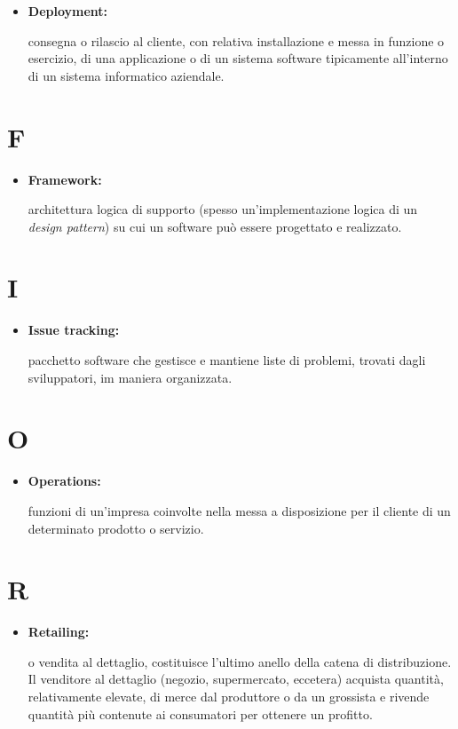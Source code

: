 \begin{itemize}
	\item \hypertarget{dep}{\textbf{Deployment:}} consegna o rilascio al cliente, con relativa installazione e messa in funzione o esercizio, di una applicazione o di un sistema software tipicamente all'interno di un sistema informatico aziendale.
\end{itemize}

\section*{F}

\begin{itemize}
	\item \hypertarget{fw}{\textbf{Framework:}} architettura logica di supporto (spesso un'implementazione logica di un \textit{design pattern}) su cui un software può essere progettato e realizzato.
\end{itemize}

\section*{I}

\begin{itemize}
	\item \hypertarget{it}{\textbf{Issue tracking:}} pacchetto software che gestisce e mantiene liste di problemi, trovati dagli sviluppatori, im maniera organizzata.
\end{itemize}

\section*{O}

\begin{itemize}
	\item \hypertarget{ops}{\textbf{Operations:}} funzioni di un'impresa coinvolte nella messa a disposizione per il cliente di un determinato prodotto o servizio.  
\end{itemize}

\section*{R}

\begin{itemize}
	\item \hypertarget{ret}{\textbf{Retailing:}} o vendita al dettaglio, costituisce l'ultimo anello della catena di distribuzione. Il venditore al dettaglio (negozio, supermercato, eccetera) acquista quantità, relativamente elevate, di merce dal produttore o da un grossista e rivende quantità più contenute ai consumatori per ottenere un profitto.
\end{itemize}

